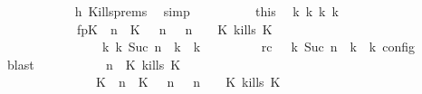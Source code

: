 \begin{isabellebody}
\ \ \ \ \ \ \ \ \ \ \isamarkupfalse%
\ h{}\ Kills{\isachardot}prems\ \isamarkupfalse%
\ simp\isanewline
\ \ \ \ \ \ \ \ \isamarkupfalse%
\ this\ \isamarkupfalse%
\ {\isasymGamma}\isactrlsub k\ {\isasymPsi}\isactrlsub k\ {\isasymPhi}\isactrlsub k\ k\ \isanewline
\ \ \ \ \ \ \ \ \ \ \ \ fp{\isacharcolon}{\isacartoucheopen}{\isacharparenleft}{\isacharparenleft}{\isacharparenleft}K\ {\isasymUp}\ n{\isacharparenright}\ {\isacharhash}\ {\isacharparenleft}K\ {\isasymnot}{\isasymUp}\ {\isasymge}\ n{\isacharparenright}\ {\isacharhash}\ {\isasymGamma}{\isacharparenright}{\isacharcomma}\ n\ {\isasymturnstile}\ {\isasymPsi}\ {\isasymtriangleright}\ {\isacharparenleft}{\isacharparenleft}K\ kills\ K\ {\isacharhash}\ {\isasymPhi}{\isacharparenright}{\isacharparenright}\isanewline
\ \ \ \ \ \ \ \ \ \ \ \ \ \ \ \ {\isasymhookrightarrow}\isactrlbsup k\isactrlesup \ {\isacharparenleft}{\isasymGamma}\isactrlsub k{\isacharcomma}\ Suc\ n\ {\isasymturnstile}\ {\isasymPsi}\isactrlsub k\ {\isasymtriangleright}\ {\isasymPhi}\isactrlsub k{\isacharparenright}{\isacartoucheclose}\isanewline
\ \ \ \ \ \ \ \ \ rc{\isacharcolon}{\isacartoucheopen}{\isasymrho}\ {\isasymin}\ {\isasymlbrakk}\ {\isasymGamma}\isactrlsub k{\isacharcomma}\ Suc\ n\ {\isasymturnstile}\ {\isasymPsi}\isactrlsub k\ {\isasymtriangleright}\ {\isasymPhi}\isactrlsub k\ {\isasymrbrakk}\isactrlsub c\isactrlsub o\isactrlsub n\isactrlsub f\isactrlsub i\isactrlsub g{\isacartoucheclose}\ \isamarkupfalse%
\ blast\isanewline
\ \ \ \ \ \ \ \ \isamarkupfalse%
\ {\isacartoucheopen}{\isacharparenleft}{\isasymGamma}{\isacharcomma}\ n\ {\isasymturnstile}\ {\isacharparenleft}{\isacharparenleft}K\ kills\ K\ {\isacharhash}\ {\isasymPsi}{\isacharparenright}\ {\isasymtriangleright}\ {\isasymPhi}{\isacharparenright}\isanewline
\ \ \ \ \ \ \ \ \ \ \ \ \ \ {\isasymhookrightarrow}\ {\isacharparenleft}{\isacharparenleft}{\isacharparenleft}K\ {\isasymUp}\ n{\isacharparenright}\ {\isacharhash}\ {\isacharparenleft}K\ {\isasymnot}{\isasymUp}\ {\isasymge}\ n{\isacharparenright}\ {\isacharhash}\ {\isasymGamma}{\isacharparenright}{\isacharcomma}\ n\ {\isasymturnstile}\ {\isasymPsi}\ {\isasymtriangleright}\ {\isacharparenleft}{\isacharparenleft}K\ kills\ K\ {\isacharhash}\ {\isasymPhi}{\isacharparenright}{\isacharparenright}{\isacartoucheclose}\isanewline

\end{isabellebody}
